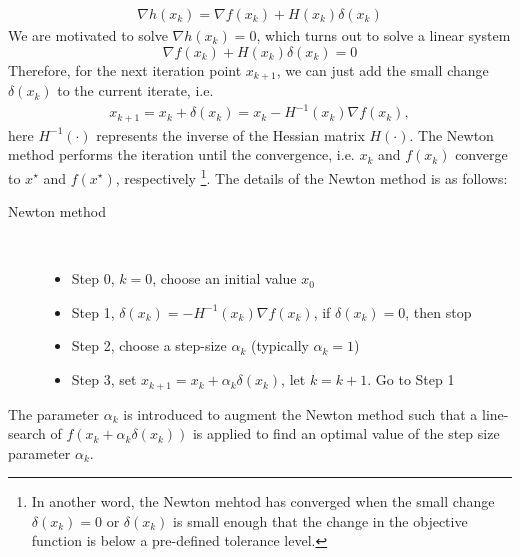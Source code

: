 \documentclass  [
  paper    = a4,
  BCOR     = 10mm,
  twoside,
  fontsize = 12pt,
  fleqn,
  toc      = bibnumbered,
  toc      = listofnumbered,
  numbers  = noendperiod,
  headings = normal,
  listof   = leveldown,
  version  = 3.03
]                                       {scrreprt}
\newcommand{\<}{\langle}
\renewcommand{\>}{\rangle}
\begin{document}
\begin{align*}
	\nabla h(x_k) = \nabla f(x_k) + H(x_k) \delta(x_k) 
\end{align*}
We are motivated to solve $\nabla h(x_k) =0$, which turns out to solve a linear system
\begin{equation}
	\nabla f(x_k) + H(x_k) \delta(x_k) =0
	\label{HessianEq}
\end{equation}
Therefore, for the next iteration point $x_{k+1}$, we can just add the small change $\delta(x_k)$ to the current iterate, i.e. 
\begin{align*}
	x_{k+1}  = x_k + \delta(x_k) = x_k - H^{-1}(x_k)\nabla f(x_k), 
\end{align*}
here $ H^{-1}(\cdot)$ represents the inverse of the Hessian matrix $H(\cdot)$. The Newton method performs the iteration until the convergence, i.e. $x_k$ and $f(x_k)$ converge to $x^\star$ and $f(x^\star)$, respectively \footnote{In another word, the Newton mehtod has converged when the small change $\delta(x_k) =0$ or $\delta(x_k)$ is small enough that the change in the objective function is below a pre-defined tolerance level.}. The details of the Newton method is as follows: 
\begin{description}
	\item[Newton method]\ 
	\begin{itemize}
		\item Step 0, $k=0$, choose an initial value $x_0$ 
		\item Step 1, $\delta(x_k)  =- H^{-1}(x_k)\nabla f(x_k)$, if $\delta(x_k) =0$, then stop
		\item Step 2, choose a step-size $\alpha_k$ (typically $\alpha_k =1$)
		\item Step 3, set $x_{k+1}  = x_k + \alpha_k \delta(x_k) $, let $k= k+1$. Go to Step 1
	\end{itemize}
\end{description}

The parameter $\alpha_k$ is introduced to augment the Newton method such that a line-search of $f(x_k + \alpha_k \delta(x_k))$ is applied to find an optimal value of the step size parameter $\alpha_k$. 
\end{document}
